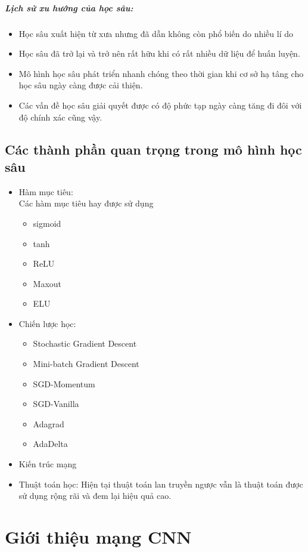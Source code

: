 \documentclass[a4paper,12pt]{report}
\begin{document}
\paragraph{Lịch sử xu hướng của học sâu:}
\begin{itemize}
\item Học sâu xuất hiện từ xưa nhưng đã dẫn không còn phổ biến do nhiều lí do
\item Học sâu đã trở lại  và trở nên rất hữu khi có rất nhiều dữ liệu để huấn luyện.
\item Mô hình học sâu phát triển nhanh chóng theo thời gian khi cơ sở hạ tâng cho học sâu ngày càng được cải thiện. 
\item Các vấn đề học sâu giải quyết được có độ phức tạp ngày càng tăng đi đôi với độ chính xác cũng vậy.
\end{itemize}
\section{Các thành phần quan trọng trong mô hình học sâu}
\begin{itemize}
\item Hàm mục tiêu:\\ Các hàm mục tiêu hay được sử dụng \begin{itemize}
\item sigmoid
\item tanh
\item ReLU
\item Maxout
\item ELU
\end{itemize}
\item Chiến lược học: \begin{itemize}
\item Stochastic Gradient Descent
\item Mini-batch Gradient Descent
\item SGD-Momentum
\item SGD-Vanilla
\item Adagrad
\item AdaDelta
\end{itemize}
\item Kiến trúc mạng
\item Thuật toán học: Hiện tại thuật toán lan truyền ngược vẫn là thuật toán được sử dụng rộng rãi và đem lại hiệu quả cao.
\end{itemize}


\chapter{Giới thiệu mạng CNN}\label{chap_CNN}
\end{document}
